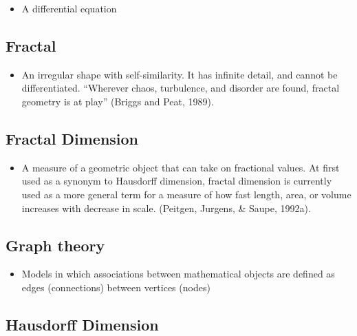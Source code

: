 \documentclass[12pt,]{book}
\providecommand{\tightlist}{%
  \setlength{\itemsep}{0pt}\setlength{\parskip}{0pt}}
\begin{document}
\begin{itemize}
\tightlist
\item
  A differential equation
\end{itemize}

\hypertarget{Frac31}{%
\subsection*{\texorpdfstring{\textbf{Fractal}}{Fractal}}\label{Frac31}}

\begin{itemize}
\tightlist
\item
  An irregular shape with self-similarity. It has infinite detail, and cannot be differentiated. ``Wherever chaos, turbulence, and disorder are found, fractal geometry is at play'' (Briggs and Peat, 1989).
\end{itemize}

\hypertarget{Frac32}{%
\subsection*{\texorpdfstring{\textbf{Fractal Dimension}}{Fractal Dimension}}\label{Frac32}}

\begin{itemize}
\tightlist
\item
  A measure of a geometric object that can take on fractional values. At first used as a synonym to Hausdorff dimension, fractal dimension is currently used as a more general term for a measure of how fast length, area, or volume increases with decrease in scale. (Peitgen, Jurgens, \& Saupe, 1992a).
\end{itemize}

\hypertarget{Grap33}{%
\subsection*{\texorpdfstring{\textbf{Graph theory}}{Graph theory}}\label{Grap33}}

\begin{itemize}
\tightlist
\item
  Models in which associations between mathematical objects are defined as edges (connections) between vertices (nodes)
\end{itemize}

\hypertarget{Haus34}{%
\subsection*{\texorpdfstring{\textbf{Hausdorff Dimension}}{Hausdorff Dimension}}\label{Haus34}}
\end{document}

